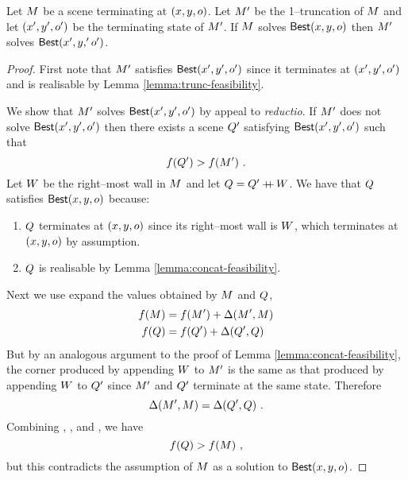 \begin{theorem}
  Let $\Scene$ be a scene terminating at $(x,y,\WallOrient)$. Let
  $\TruncScene$ be the 1--truncation of $\Scene$ and let
  $(x',y',\WallOrient')$ be the terminating state of
  $\TruncScene$. If $\Scene$ solves $\SubProb(x,y,\WallOrient)$
  then $\TruncScene$ solves $\SubProb(x',y,'\WallOrient')$.
  \label{thm:substructure}
\end{theorem}
\begin{proof}
  First note that $\TruncScene$ satisfies
  $\SubProb(x',y',\WallOrient')$ since it terminates at
  $(x',y',\WallOrient')$ and is realisable by Lemma
  \ref{lemma:trunc-feasibility}.

  We show that $\TruncScene$ solves $\SubProb(x',y',\WallOrient')$
  by appeal to \textit{reductio}. If $\TruncScene$ does not solve
  $\SubProb(x',y',\WallOrient')$ then there exists a scene
  $\CfTruncScene$ satisfying $\SubProb(x',y',\WallOrient')$ such
  that
  \begin{equation}
    \label{eq:cf-value}
    \Objective(\CfTruncScene) > \Objective(\TruncScene) ~.
  \end{equation}
  Let $\Wall$ be the right--most wall in $\Scene$ and let $\CfScene =
  \CfTruncScene \concat \Wall$. We have that $\CfScene$ satisfies
  $\SubProb(x,y,\WallOrient)$ because:
  \begin{enumerate}
    \item{$\CfScene$ terminates at $(x,y,\WallOrient)$ since its
      right--most wall is $\Wall$, which terminates at
      $(x,y,\WallOrient)$ by assumption.}
    \item{$\CfScene$ is realisable by Lemma
      \ref{lemma:concat-feasibility}.}
  \end{enumerate}
  Next we use  expand the values
  obtained by $\Scene$ and $\CfScene$,
  \begin{equation}
  \begin{split}
    \label{eq:concat-values}
    \Objective(\Scene) &=
      \Objective(\TruncScene) + \edgevalue(\TruncScene,\Scene)\\
    \Objective(\CfScene) &=
      \Objective(\CfTruncScene) + \edgevalue(\CfTruncScene,\CfScene)
  \end{split}
  \end{equation}
  But by an analogous argument to the proof of Lemma
  \ref{lemma:concat-feasibility}, the corner produced by appending
  $\Wall$ to $\TruncScene$ is the same as that produced by appending
  $\Wall$ to $\CfTruncScene$ since $\TruncScene$ and $\CfTruncScene$
  terminate at the same state. Therefore
  \begin{equation}
    \label{eq:equal-penalties}
    \edgevalue(\TruncScene,\Scene) =
    \edgevalue(\CfTruncScene,\CfScene) ~.
  \end{equation}
  Combining , , and
  , we have
  \begin{equation}
    \Objective(\CfScene) > \Objective(\Scene) ~,
  \end{equation}
  but this contradicts the assumption of $\Scene$ as a solution to
  $\SubProb(x,y,\WallOrient)$.
\end{proof}


